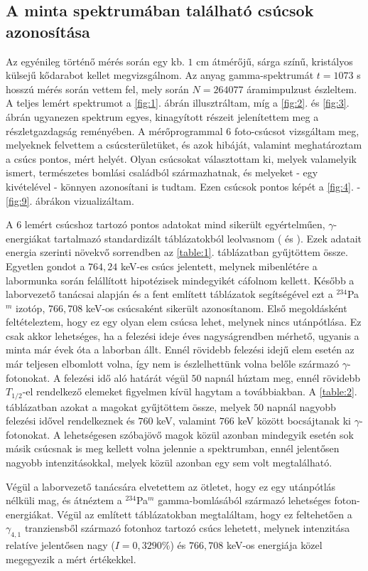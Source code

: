 \begin{multicols}{2}
\subsection{A minta spektrumában található csúcsok azonosítása}
Az egyénileg történő mérés során egy kb. $1$ cm átmérőjű, sárga színű, kristályos külsejű kődarabot kellet megvizsgálnom. Az anyag gamma-spektrumát $t = 1073$ s hosszú mérés során vettem fel, mely során $N = 264077$ áramimpulzust észleltem. A teljes lemért spektrumot a \ref{fig:1}. ábrán illusztráltam, míg a \ref{fig:2}. és \ref{fig:3}. ábrán ugyanezen spektrum egyes, kinagyított részeit jelenítettem meg a részletgazdagság reményében. \newline
A mérőprogrammal $6$ foto-csúcsot vizsgáltam meg, melyeknek felvettem a csúcsterületüket, és azok hibáját, valamint meghatároztam a csúcs pontos, mért helyét. Olyan csúcsokat választottam ki, melyek valamelyik ismert, természetes bomlási családból származhatnak, és melyeket - egy kivételével - könnyen azonosítani is tudtam. Ezen csúcsok pontos képét a \ref{fig:4}. - \ref{fig:9}. ábrákon vizualizáltam. \par
A $6$ lemért csúcshoz tartozó pontos adatokat mind sikerült egyértelműen, $\gamma$-energiákat tartalmazó standardizált táblázatokból leolvasnom (\cite{firestone19978th} és \cite{lnbl_nuclear}). Ezek adatait energia szerinti növekvő sorrendben az \ref{table:1}. táblázatban gyűjtöttem össze. Egyetlen gondot a $764,24$ keV-es csúcs jelentett, melynek mibenlétére a labormunka során felállított hipotézisek mindegyikét cáfolnom kellett. Később a laborvezető tanácsai alapján és a fent említett táblázatok segítségével ezt a $^{234}$Pa$^{m}$ izotóp, $766,708$ keV-os csúcsaként sikerült azonosítanom. Első megoldásként feltételeztem, hogy ez egy olyan elem csúcsa lehet, melynek nincs utánpótlása. Ez csak akkor lehetséges, ha a felezési ideje éves nagyságrendben mérhető, ugyanis a minta már évek óta a laborban állt. Ennél rövidebb felezési idejű elem esetén az már teljesen elbomlott volna, így nem is észlelhettünk volna belőle származó $\gamma$-fotonokat. A felezési idő aló határát végül $50$ napnál húztam meg, ennél rövidebb $T_{1/2}$-el rendelkező elemeket figyelmen kívül hagytam a továbbiakban. A \ref{table:2}. táblázatban azokat a magokat gyűjtöttem össze, melyek $50$ napnál nagyobb felezési idővel rendelkeznek és $760$ keV, valamint $766$ keV között bocsájtanak ki $\gamma$-fotonokat. A lehetségesen szóbajövő magok közül azonban mindegyik esetén sok másik csúcsnak is meg kellett volna jelennie a spektrumban, ennél jelentősen nagyobb intenzitásokkal, melyek közül azonban egy sem volt megtalálható. \par
Végül a laborvezető tanácsára elvetettem az ötletet, hogy ez egy utánpótlás nélküli mag, és átnéztem a $^{234}$Pa$^{m}$ gamma-bomlásából származó lehetséges foton-energiákat. Végül az említett táblázatokban megtaláltam, hogy ez feltehetően a $\gamma_{4,1}$ tranziensből származó fotonhoz tartozó csúcs lehetett, melynek intenzitása relatíve jelentősen nagy ($I = 0,3290 \%$) és $766,708$ keV-os energiája közel megegyezik a mért értékekkel.


\end{multicols}
